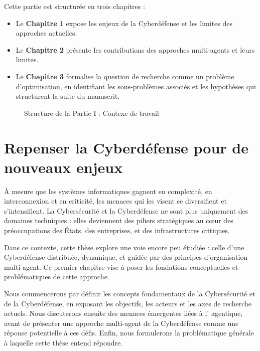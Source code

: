 \vspace{1em}

Cette partie est structurée en trois chapitres :
\begin{itemize}
    \item Le \textbf{Chapitre 1} expose les enjeux de la Cyberdéfense et les limites des approches actuelles.
    \item Le \textbf{Chapitre 2} présente les contributions des approches multi-agents et leurs limites.
    \item Le \textbf{Chapitre 3} formalise la question de recherche comme un problème d'optimisation, en identifiant les sous-problèmes associés et les hypothèses qui structurent la suite du manuscrit.
\end{itemize}
\clearpage

\begin{figure}[h!]
    \centering
    \resizebox{\textwidth}{!}{%
        
    }
    \caption{Structure de la Partie I : Contexe de travail}
    \label{fig:organisation_manuscrit_partie_1}
\end{figure}


\chapter{Repenser la Cyberdéfense pour de nouveaux enjeux}

\noindent
À mesure que les systèmes informatiques gagnent en complexité, en interconnexion et en criticité, les menaces qui les visent se diversifient et s'intensifient. La Cybersécurité et la Cyberdéfense ne sont plus uniquement des domaines techniques : elles deviennent des piliers stratégiques au cœur des préoccupations des États, des entreprises, et des infrastructures critiques.

Dans ce contexte, cette thèse explore une voie encore peu étudiée : celle d'une Cyberdéfense distribuée, dynamique, et guidée par des principes d'organisation multi-agent. Ce premier chapitre vise à poser les fondations conceptuelles et problématiques de cette approche.

Nous commencerons par définir les concepts fondamentaux de la Cybersécurité et de la Cyberdéfense, en exposant les objectifs, les acteurs et les axes de recherche actuels. Nous discuterons ensuite des menaces émergentes liées à l' agentique, avant de présenter une approche multi-agent de la Cyberdéfense comme une réponse potentielle à ces défis. Enfin, nous formulerons la problématique générale à laquelle cette thèse entend répondre.

